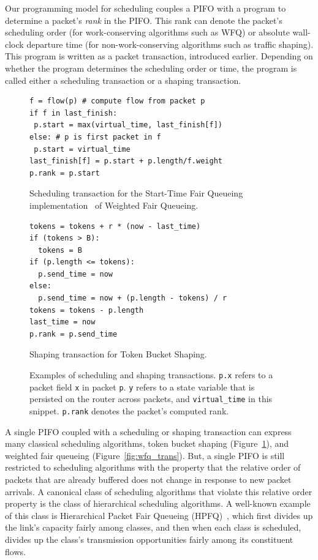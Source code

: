  Our programming model for
scheduling couples a PIFO with a program to determine a packet's {\em rank} in
the PIFO. This rank can denote the packet's scheduling order (for
work-conserving algorithms such as WFQ) or absolute wall-clock departure time
(for non-work-conserving algorithms such as traffic shaping). This program is
written as a packet transaction, introduced earlier.  Depending on whether the
program determines the scheduling order or time, the program is called either a
scheduling transaction or a shaping transaction.

\begin{figure}
\begin{minipage}[!h]{0.48\textwidth}
\vspace{0.4in}
\begin{lstlisting}[style=customcscriptsize]
f = flow(p) # compute flow from packet p
if f in last_finish:
 p.start = max(virtual_time, last_finish[f])
else: # p is first packet in f
 p.start = virtual_time
last_finish[f] = p.start + p.length/f.weight
p.rank = p.start
\end{lstlisting}
\caption{Scheduling transaction for the Start-Time Fair Queueing implementation~\cite{stfq} of Weighted Fair Queueing.}
\label{fig:wfq_trans}
\hfill
\end{minipage}
\begin{minipage}[!h]{0.48\textwidth}
\begin{lstlisting}[style=customcscriptsize]
tokens = tokens + r * (now - last_time)
if (tokens > B):
  tokens = B
if (p.length <= tokens):
  p.send_time = now
else:
  p.send_time = now + (p.length - tokens) / r
tokens = tokens - p.length
last_time = now
p.rank = p.send_time
\end{lstlisting}
\caption{Shaping transaction for Token Bucket Shaping.}
\label{fig:tbf_trans}
\end{minipage}
\caption{Examples of scheduling and shaping transactions. {\tt p.x} refers to a packet field {\tt x} in packet {\tt p}.  {\tt y} refers to a state variable
that is persisted on the router across packets, 
and {\tt virtual\_time} in this snippet. {\tt p.rank} denotes the
packet's computed rank.}
\end{figure}

A single PIFO coupled with a scheduling or shaping transaction can express many
classical scheduling algorithms, \eg token bucket shaping
(Figure~\ref{fig:tbf_trans}), and weighted fair queueing
(Figure~\ref{fig:wfq_trans}). But, a single PIFO is still restricted to
scheduling algorithms with the property that the relative order of packets that
are already buffered does not change in response to new packet arrivals. A
canonical class of scheduling algorithms that violate this relative order
property is the class of hierarchical scheduling algorithms. A well-known
example of this class is Hierarchical Packet Fair Queueing (HPFQ)~\cite{hpfq},
which first divides up the link's capacity fairly among classes, and then when each
class is scheduled, divides up the class's transmission opportunities fairly
among its constituent flows.

